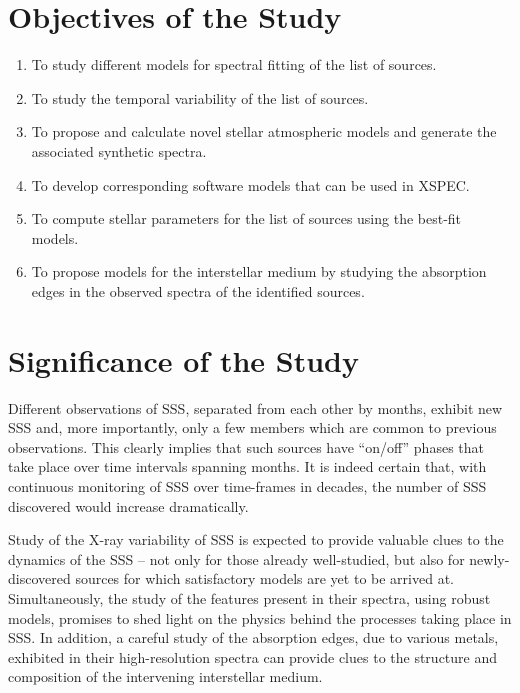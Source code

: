     \section{Objectives of the Study} \label{introduction:objectives}
    	\begin{enumerate}
			\item To study different models for spectral fitting of the list of sources.
			\item To study the temporal variability of the list of sources.
			\item To propose and calculate novel stellar atmospheric models and generate the associated synthetic spectra.
			\item To develop corresponding software models that can be used in XSPEC.
			\item To compute stellar parameters for the list of sources using the best-fit models.
			\item To propose models for the interstellar medium by studying the absorption edges in the observed spectra of the identified sources.
		\end{enumerate}
    
    \section{Significance of the Study} \label{introduction:significance}
        Different observations of SSS, separated from each other by months, exhibit new SSS and, more importantly, only a few members which are common to previous observations. This clearly implies that such sources have ``on/off'' phases that take place over time intervals spanning months. It is indeed certain that, with continuous monitoring of SSS over time-frames in decades, the number of SSS discovered would increase dramatically.
        
        Study of the X-ray variability of SSS is expected to provide valuable clues to the dynamics of the SSS -- not only for those already well-studied, but also for newly-discovered sources for which satisfactory models are yet to be arrived at. Simultaneously, the study of the features present in their spectra, using robust models, promises to shed light on the physics behind the processes taking place in SSS. In addition, a careful study of the absorption edges, due to various metals, exhibited in their high-resolution spectra can provide clues to the structure and composition of the intervening interstellar medium.
        
